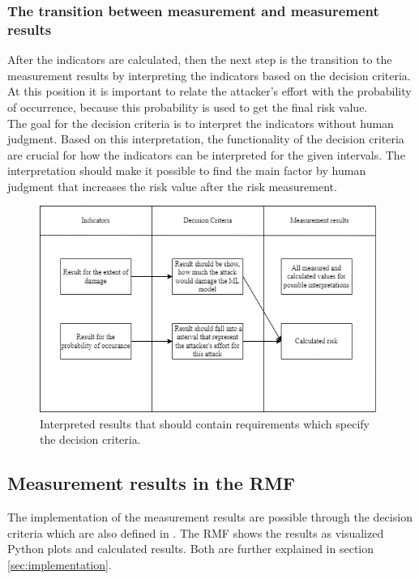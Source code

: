 \subsubsection*{The transition between measurement and measurement results}

After the indicators are calculated, then the next step is the transition to the measurement results by interpreting the indicators based on the decision criteria. At this position it is important to
relate the attacker's effort with the probability of occurrence, because this probability is used to get the final risk value. \\
The goal for the decision criteria is to interpret the indicators without human judgment. Based on this interpretation, the functionality of the decision criteria are crucial for how the indicators can be interpreted for the given intervals. The interpretation should make it possible to find the main factor by human judgment that increases the risk value after the risk measurement.

\begin{figure}[ht!]
  \centering
  \includegraphics[width=11cm]{pictures/measurement_results_concept.png}
  \caption{Interpreted results that should contain requirements which specify the decision criteria.}
  \label{fig:measurement_results_concept}
\end{figure}

\subsection{Measurement results in the RMF}
\label{sec:measurement_results}

The implementation of the measurement results are possible through the decision criteria which are also defined in \cite{ISO_27004_2009}. The RMF shows the results as visualized Python plots and calculated results. Both are further explained in section \ref{sec:implementation}.

